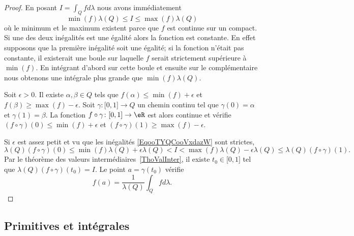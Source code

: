 \begin{proof}
	En posant \( I=\int_Qfd\lambda\) nous avons immédiatement
	\begin{equation}        \label{EqooTYQCooVxdazW}
		\min(f)\lambda(Q)\leq I\leq \max(f)\lambda(Q)
	\end{equation}
	où le minimum et le maximum existent parce que \( f\) est continue sur un compact. Si une des deux inégalités est une égalité alors la fonction est constante. En effet supposons que la première inégalité soit une égalité; si la fonction n'était pas constante, il existerait une boule sur laquelle \( f\) serait strictement supérieure à \( \min(f)\). En intégrant d'abord sur cette boule et ensuite sur le complémentaire nous obtenons une intégrale plus grande que \( \min(f)\lambda(Q)\).

	Soit \( \epsilon>0\). Il existe \( \alpha,\beta\in Q\) tels que \( f(\alpha)\leq\min(f)+\epsilon\) et \( f(\beta)\geq\max(f)-\epsilon\). Soit \( \gamma\colon \mathopen[ 0 , 1 \mathclose]\to Q\) un chemin continu tel que \( \gamma(0)=\alpha\) et \( \gamma(1)=\beta\). La fonction \( f\circ \gamma\colon \mathopen[ 0 , 1 \mathclose]\to \eR\) est alors continue et vérifie \( (f\circ\gamma)(0)\leq \min(f)+\epsilon\) et \( (f\circ\gamma)(1)\geq \max(f)-\epsilon\).

	Si \( \epsilon\) est assez petit et vu que les inégalités \eqref{EqooTYQCooVxdazW} sont strictes,
	\begin{equation}
		\lambda(Q)(f\circ\gamma)(0)\leq \min(f)\lambda(Q)+\epsilon\lambda(Q)<I<\max(f)\lambda(Q)-\epsilon\lambda(Q)\leq\lambda(Q)(f\circ \gamma)(1).
	\end{equation}
	Par le théorème des valeurs intermédiaires~\ref{ThoValInter}, il existe \( t_0\in\mathopen[ 0 , 1 \mathclose]\) tel que \( \lambda(Q)(f\circ\gamma)(t_0)=I\). Le point \( a=\gamma(t_0)\) vérifie
	\begin{equation}
		f(a)=\frac{1}{ \lambda(Q) }\int_Qfd\lambda.
	\end{equation}
\end{proof}

\subsection{Primitives et intégrales}

